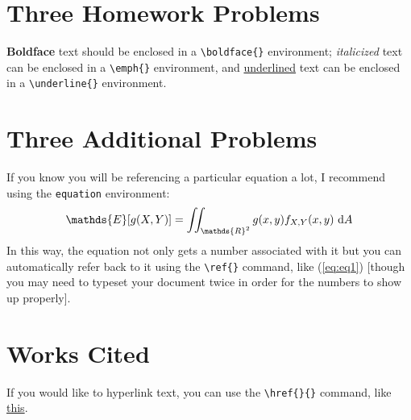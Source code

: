 \documentclass[11pt]{article}
\newcommand{\E}{\mathds{E}}         %
\newcommand{\1}{\mathds{1}}         %
\newcommand{\R}{\mathds{R}}     %
\begin{document}
\section{Three Homework Problems}

\textbf{Boldface} text should be enclosed in a \verb|\boldface{}| environment; \emph{italicized} text can be enclosed in a \verb|\emph{}| environment, and \underline{underlined} text can be enclosed in a \verb|\underline{}| environment.



\section{Three Additional Problems}

If you know you will be referencing a particular equation a lot, I recommend using the \verb|equation| environment:
\begin{equation}{ \label{eq:eq1}
    \E[g(X, Y)]   = \iint_{\R^2} g(x, y) f_{X, Y}(x, y) \ \mathrm{d}A
}\end{equation}
In this way, the equation not only gets a number associated with it but you can automatically refer back to it using the \verb|\ref{}| command, like (\ref{eq:eq1}) [though you may need to typeset your document twice in order for the numbers to show up properly].


\section{Works Cited}

If you would like to hyperlink text, you can use the \verb|\href{}{}| command, like \href{https://pstat120a.github.io}{this}.
\end{document}
